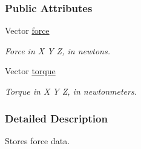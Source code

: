 \subsubsection*{Public Attributes}
\begin{DoxyCompactItemize}
\item 
\hypertarget{classOpenRAVE_1_1SensorBase_1_1Force6DSensorData_a81e5356103da3b181dd80b231b066d73}{
Vector \hyperlink{classOpenRAVE_1_1SensorBase_1_1Force6DSensorData_a81e5356103da3b181dd80b231b066d73}{force}}
\label{classOpenRAVE_1_1SensorBase_1_1Force6DSensorData_a81e5356103da3b181dd80b231b066d73}

\begin{DoxyCompactList}\small\item\em Force in X Y Z, in newtons. \item\end{DoxyCompactList}\item 
\hypertarget{classOpenRAVE_1_1SensorBase_1_1Force6DSensorData_ad8a04b9a1eecb049b4665906cf72b2bf}{
Vector \hyperlink{classOpenRAVE_1_1SensorBase_1_1Force6DSensorData_ad8a04b9a1eecb049b4665906cf72b2bf}{torque}}
\label{classOpenRAVE_1_1SensorBase_1_1Force6DSensorData_ad8a04b9a1eecb049b4665906cf72b2bf}

\begin{DoxyCompactList}\small\item\em Torque in X Y Z, in newtonmeters. \item\end{DoxyCompactList}\end{DoxyCompactItemize}


\subsubsection{Detailed Description}
Stores force data. 
